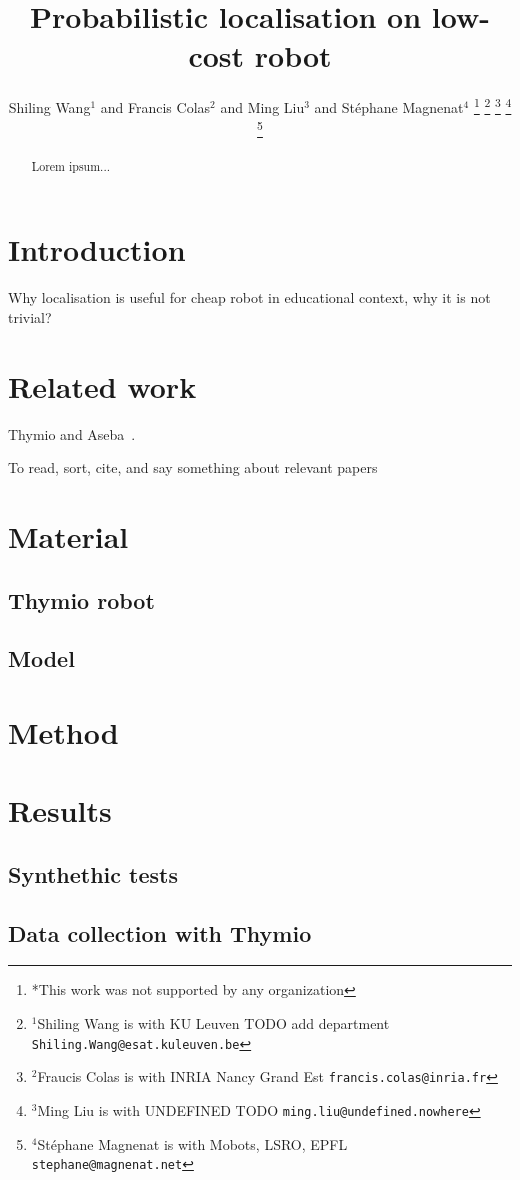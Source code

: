 \documentclass[letterpaper, 10pt, conference]{ieeeconf}
\title{\LARGE \bf
Probabilistic localisation on low-cost robot
}
\author{Shiling Wang$^{1}$ and Francis Colas$^{2}$ and Ming Liu$^{3}$ and Stéphane Magnenat$^{4}$%
\thanks{*This work was not supported by any organization}%
\thanks{$^{1}$Shiling Wang is with KU Leuven TODO add department
        {\tt\small Shiling.Wang@esat.kuleuven.be}}%
\thanks{$^{2}$Fraucis Colas is with INRIA Nancy Grand Est
        {\tt\small francis.colas@inria.fr}}%
\thanks{$^{3}$Ming Liu is with UNDEFINED TODO
        {\tt\small ming.liu@undefined.nowhere}}%
\thanks{$^{4}$Stéphane Magnenat is with Mobots, LSRO, EPFL
        {\tt\small stephane@magnenat.net}}%
}
\begin{document}
\maketitle
\thispagestyle{empty}
\pagestyle{empty}

\begin{abstract}
Lorem ipsum...
\end{abstract}

\section{Introduction}

Why localisation is useful for cheap robot in educational context, why it is not trivial?

\section{Related work}

Thymio and Aseba~\cite{magnenat2012arso, aseba2011tmech, riedo2013arso}.

To read, sort, cite, and say something about relevant papers

\section{Material}

\subsection{Thymio robot}

\subsection{Model}

\section{Method}

\section{Results}

\subsection{Synthethic tests}

\subsection{Data collection with Thymio}
\end{document}
